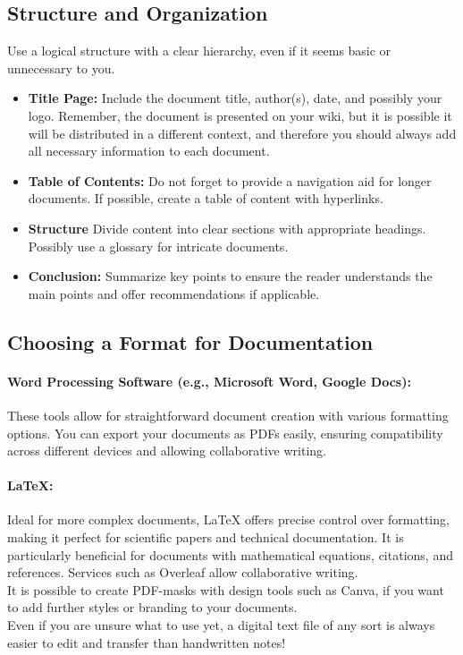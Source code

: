 \subsection*{Structure and Organization}
Use a logical structure with a clear hierarchy, even if it seems basic or unnecessary to you.
\begin{itemize}
    \item \textbf{Title Page:} Include the document title, author(s), date, and possibly your logo.
    Remember, the document is presented on your wiki, but it is possible it will be distributed in a different context, and therefore you should always add all necessary information to each document.
    \item \textbf{Table of Contents:} Do not forget to provide a navigation aid for longer documents.
     If possible, create a table of content with hyperlinks.
    \item \textbf{Structure} Divide content into clear sections with appropriate headings.
    Possibly use a glossary for intricate documents.
    \item \textbf{Conclusion:} Summarize key points to ensure the reader understands the main points and offer recommendations if applicable.
\end{itemize}


\subsection*{Choosing a Format for Documentation}
\paragraph{Word Processing Software (e.g., Microsoft Word, Google Docs):} These tools allow for straightforward document creation with various formatting options.
You can export your documents as PDFs easily, ensuring compatibility across different devices and allowing collaborative writing.
\paragraph{LaTeX:} Ideal for more complex documents, LaTeX offers precise control over formatting, making it perfect for scientific papers and technical documentation.
It is particularly beneficial for documents with mathematical equations, citations, and references.
Services such as Overleaf allow collaborative writing. \\  \newline
It is possible to create PDF-masks with design tools such as Canva, if you want to add further styles or branding to your documents.\\ \newline
Even if you are unsure what to use yet, a digital text file of any sort is always easier to edit and transfer than handwritten notes!


